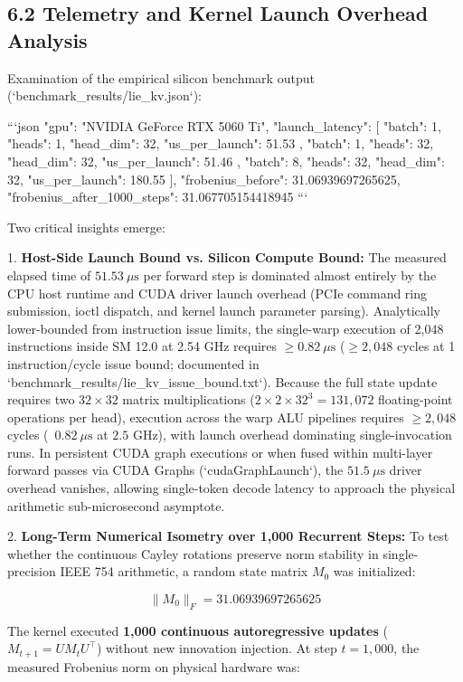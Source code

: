 \documentclass[11pt,twoside,openright]{amsbook}
\begin{document}
{{{{{{{\subsection{6.2 Telemetry and Kernel Launch Overhead Analysis}

Examination of the empirical silicon benchmark output (`benchmark_results/lie_kv.json`):

```json
{
  "gpu": "NVIDIA GeForce RTX 5060 Ti",
  "launch_latency": [
    {
      "batch": 1,
      "heads": 1,
      "head_dim": 32,
      "us_per_launch": 51.53
    },
    {
      "batch": 1,
      "heads": 32,
      "head_dim": 32,
      "us_per_launch": 51.46
    },
    {
      "batch": 8,
      "heads": 32,
      "head_dim": 32,
      "us_per_launch": 180.55
    }
  ],
  "frobenius_before": 31.06939697265625,
  "frobenius_after_1000_steps": 31.067705154418945
}
```

Two critical insights emerge:

1. \textbf{Host-Side Launch Bound vs. Silicon Compute Bound:}  
   The measured elapsed time of \textbf{$51.53\ \mu\text{s}$} per forward step is dominated almost entirely by the CPU host runtime and CUDA driver launch overhead (PCIe command ring submission, ioctl dispatch, and kernel launch parameter parsing).  
   Analytically lower-bounded from instruction issue limits, the single-warp execution of 2,048 instructions inside SM 12.0 at 2.54 GHz requires \textbf{$\ge 0.82\ \mu\text{s}$} ($\ge 2,048$ cycles at 1 instruction/cycle issue bound; documented in `benchmark_results/lie_kv_issue_bound.txt`).  
   Because the full state update requires two $32 \times 32$ matrix multiplications ($2 \times 2 \times 32^3 = 131,072$ floating-point operations per head), execution across the warp ALU pipelines requires $\ge 2,048$ cycles (~$0.82\ \mu\text{s}$ at $2.5\text{ GHz}$), with launch overhead dominating single-invocation runs. In persistent CUDA graph executions or when fused within multi-layer forward passes via CUDA Graphs (`cudaGraphLaunch`), the $51.5\ \mu\text{s}$ driver overhead vanishes, allowing single-token decode latency to approach the physical arithmetic sub-microsecond asymptote.

2. \textbf{Long-Term Numerical Isometry over 1,000 Recurrent Steps:}  
   To test whether the continuous Cayley rotations preserve norm stability in single-precision IEEE 754 arithmetic, a random state matrix $M_0$ was initialized:
   
   $$\|M_0\|_F = 31.06939697265625$$
   
   The kernel executed \textbf{1,000 continuous autoregressive updates} ($M_{t+1} = U M_t U^\top$) without new innovation injection. At step $t = 1,000$, the measured Frobenius norm on physical hardware was:
   
}}}}}}}
\end{document}
